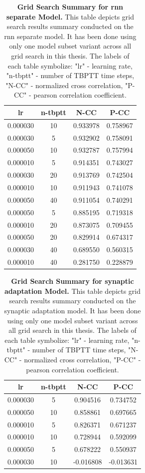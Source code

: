 \begin{table}
    \centering\footnotesize\sf
    \begin{tabular}{cccc}
    \toprule
    lr & n-tbptt & N-CC & P-CC \\
    \midrule
    0.000030 & 10 & 0.933978 & 0.758967 \\
    0.000030 & 5 & 0.932902 & 0.758091 \\
    0.000050 & 10 & 0.932787 & 0.757994 \\
    0.000010 & 5 & 0.914351 & 0.743027 \\
    0.000030 & 20 & 0.913769 & 0.742504 \\
    0.000010 & 10 & 0.911943 & 0.741078 \\
    0.000050 & 40 & 0.911054 & 0.740291 \\
    0.000050 & 5 & 0.885195 & 0.719318 \\
    0.000010 & 20 & 0.873075 & 0.709455 \\
    0.000050 & 20 & 0.829914 & 0.674317 \\
    0.000030 & 40 & 0.689550 & 0.560315 \\
    0.000010 & 40 & 0.281750 & 0.228879 \\
    \bottomrule
    \end{tabular}
    \caption{\textbf{Grid Search Summary for rnn separate Model.} This table depicts grid search results summary conducted on the rnn separate model. It has been done using only one model subset variant across all grid search in this thesis. The labels of each table symbolize: "lr" - learning rate, "n-tbptt" - number of TBPTT time steps, "N-CC" - normalized cross correlation, "P-CC" - pearson correlation coefficient.}
    \label{tab:grid_rnn_separate}
\end{table}

\begin{table}
    \centering\footnotesize\sf
    \begin{tabular}{cccc}
    \toprule
    lr & n-tbptt & N-CC & P-CC \\
    \midrule
    0.000030 & 5 & 0.904516 & 0.734752 \\
    0.000050 & 10 & 0.858861 & 0.697665 \\
    0.000010 & 5 & 0.826371 & 0.671237 \\
    0.000010 & 10 & 0.728944 & 0.592099 \\
    0.000050 & 5 & 0.678222 & 0.550937 \\
    0.000030 & 10 & -0.016808 & -0.013631 \\
    \bottomrule
    \end{tabular}
    \caption{\textbf{Grid Search Summary for synaptic adaptation Model.} This table depicts grid search results summary conducted on the synaptic adaptation model. It has been done using only one model subset variant across all grid search in this thesis. The labels of each table symbolize: "lr" - learning rate, "n-tbptt" - number of TBPTT time steps, "N-CC" - normalized cross correlation, "P-CC" - pearson correlation coefficient.}
    \label{tab:grid_synaptic_adaptation}
\end{table}


